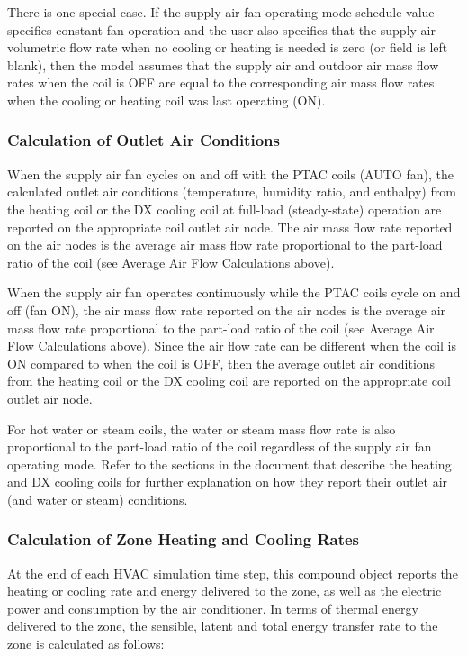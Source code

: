 There is one special case. If the supply air fan operating mode schedule value specifies constant fan operation and the user also specifies that the supply air volumetric flow rate when no cooling or heating is needed is zero (or field is left blank), then the model assumes that the supply air and outdoor air mass flow rates when the coil is OFF are equal to the corresponding air mass flow rates when the cooling or heating coil was last operating (ON).

\subsubsection{Calculation of Outlet Air Conditions}\label{calculation-of-outlet-air-conditions}

When the supply air fan cycles on and off with the PTAC coils (AUTO fan), the calculated outlet air conditions (temperature, humidity ratio, and enthalpy) from the heating coil or the DX cooling coil at full-load (steady-state) operation are reported on the appropriate coil outlet air node. The air mass flow rate reported on the air nodes is the average air mass flow rate proportional to the part-load ratio of the coil (see Average Air Flow Calculations above).

When the supply air fan operates continuously while the PTAC coils cycle on and off (fan ON), the air mass flow rate reported on the air nodes is the average air mass flow rate proportional to the part-load ratio of the coil (see Average Air Flow Calculations above). Since the air flow rate can be different when the coil is ON compared to when the coil is OFF, then the average outlet air conditions from the heating coil or the DX cooling coil are reported on the appropriate coil outlet air node.

For hot water or steam coils, the water or steam mass flow rate is also proportional to the part-load ratio of the coil regardless of the supply air fan operating mode. Refer to the sections in the document that describe the heating and DX cooling coils for further explanation on how they report their outlet air (and water or steam) conditions.

\subsubsection{Calculation of Zone Heating and Cooling Rates}\label{calculation-of-zone-heating-and-cooling-rates}

At the end of each HVAC simulation time step, this compound object reports the heating or cooling rate and energy delivered to the zone, as well as the electric power and consumption by the air conditioner. In terms of thermal energy delivered to the zone, the sensible, latent and total energy transfer rate to the zone is calculated as follows:

